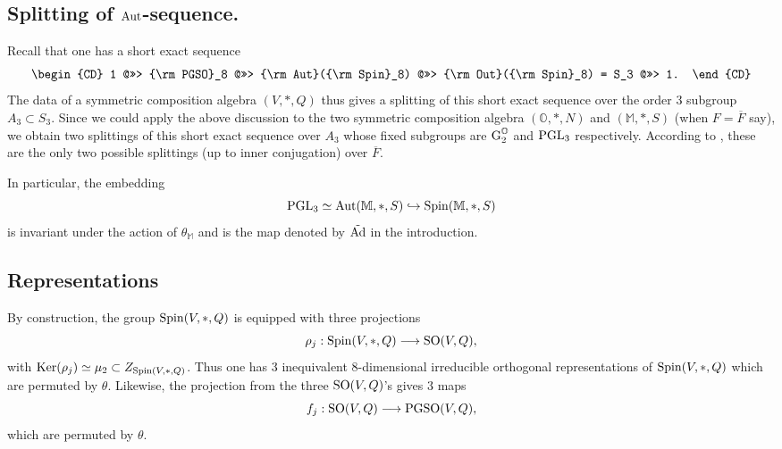 \documentclass[11pt]{amsart}
\theoremstyle{plain}
\numberwithin{equation}{section}
\def\Aut{{\rm Aut}}
\def\PGSO{{\rm PGSO}}
\def\Spin{{\rm Spin}}
\def\Spin{{\rm Spin}}
\def\PGL{{\rm PGL}}
\def\SO{{\rm SO}}
\begin{document}
 \vskip 10pt

 
 \subsection{\bf Splitting of $\Aut$-sequence.}
Recall that one has a short exact sequence
\begin{equation} \label{E:Aut}
  \begin{CD}
1 @>>> \PGSO_8 @>>>  \Aut(\Spin_8)  @>>>   {\rm Out}(\Spin_8) = S_3 @>>> 1. \end{CD} \end{equation}
The data of a symmetric composition algebra $(V,\ast, Q)$ thus gives a splitting of this short exact sequence over the order 3 subgroup $A_3 \subset S_3$. Since we could apply the above discussion to the two symmetric composition algebra $(\mathbb{O}, \ast, N)$ and $(\mathbb{M}, \ast, S)$ (when $F = \overline{F}$ say), we obtain two splittings of this short exact sequence over $A_3$ whose fixed subgroups are ${\rm G}_2^\mathbb{O}$ and $\PGL_3$ respectively. According to \cite[Pg. 487, Cor. 35.10 and Prop. 36.14]{KMRT}, these are the only two possible splittings (up to inner conjugation) over $\overline{F}$.  
\vskip 5pt

In particular, the embedding
\[  \PGL_3 \simeq \Aut(\mathbb{M}, \ast, S) \hookrightarrow \Spin(\mathbb{M}, \ast, S)  \]
is invariant under the action of $\theta_{\mathbb{M}}$  and is the map denoted by $\tilde{\rm Ad}$ in the introduction.
\vskip 5pt


\subsection{\bf Representations}
 By construction, the group $\Spin(V, \ast, Q)$ is equipped with  three projections  
\[  \rho_j:  \Spin(V,\ast, Q) \longrightarrow \SO(V,Q), \]
with ${\rm Ker}(\rho_j) \simeq \mu_2 \subset Z_{\Spin(V, \ast, Q)}$.  Thus one has 3 inequivalent $8$-dimensional irreducible orthogonal representations of $\Spin(V,\ast, Q)$ which are permuted by $\theta$.
Likewise,  the projection from the three $\SO(V,Q)$'s  gives 3 maps
\[  f_j:  \SO(V,Q) \longrightarrow \PGSO(V,Q), \]
which are permuted by $\theta$.
\vskip 5pt
\end{document}
